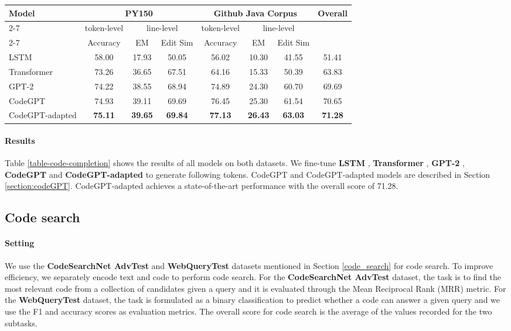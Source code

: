 \documentclass[sigconf,nonacm,screen]{acmart}
\begin{document}
\begin{table*}[h]
\centering
    \caption{Results on the code completion task.}
    \label{table-code-completion}
    \begin{tabular}{lccccccc}
    \toprule
    \multirow{3}{*}{Model} & \multicolumn{3}{c}{PY150} & \multicolumn{3}{c}{Github Java Corpus} & \multirow{3}{*}{Overall} \\
    \cmidrule{2-7}
    & token-level & \multicolumn{2}{c}{line-level} & token-level & \multicolumn{2}{c}{line-level} & \\
    \cmidrule{2-7}
    & Accuracy & EM & Edit Sim & Accuracy & EM & Edit Sim & \\
    \midrule
    LSTM & 58.00 & 17.93 & 50.05 & 56.02 & 10.30 & 41.55 & 51.41 \\
    Transformer & 73.26 & 36.65 & 67.51 & 64.16 & 15.33 & 50.39 & 63.83 \\
    GPT-2 & 74.22 & 38.55 & 68.94 & 74.89 & 24.30 & 60.70 & 69.69 \\
    CodeGPT & 74.93 & 39.11 & 69.69 & 76.45 & 25.30 & 61.54 & 70.65 \\
    CodeGPT-adapted & \bf{75.11} & \bf{39.65} & \bf{69.84} & \bf{77.13} & \bf{26.43} & \bf{63.03} & \bf{71.28} \\
    \bottomrule
    \end{tabular}
\end{table*}

\paragraph{Results} 
Table \ref{table-code-completion} shows the results of all models on both datasets. We fine-tune \textbf{LSTM} \cite{hochreiter1997long}, \textbf{Transformer} \cite{vaswani2017attention}, \textbf{GPT-2} \cite{radford2019language}, \textbf{CodeGPT} and \textbf{CodeGPT-adapted} to generate following tokens.
CodeGPT and CodeGPT-adapted models are described in Section \ref{section:codeGPT}.
CodeGPT-adapted achieves a state-of-the-art performance with the overall score of 71.28.


\subsection{Code search}
\paragraph{Setting} We use the \textbf{CodeSearchNet AdvTest} and \textbf{WebQueryTest} datasets mentioned in Section \ref{code_search} for code search. To improve efficiency, we separately encode text and code to perform code search. For the \textbf{CodeSearchNet AdvTest} dataset, the task is to find the most relevant code from a collection of candidates given a query and  it is evaluated through the Mean Reciprocal Rank (MRR) metric. For the \textbf{WebQueryTest} dataset, the task is formulated as a binary classification to predict whether a code can answer a given query
and we use the F1 and accuracy scores as evaluation metrics. The overall score for code search is the average of the values recorded for the two subtasks. 
\end{document}
